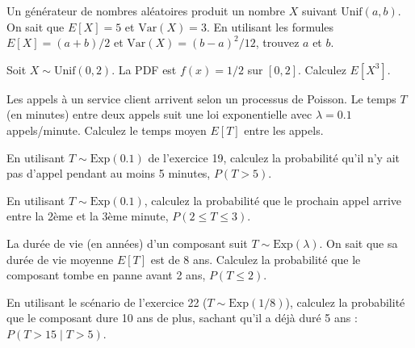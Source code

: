 \begin{exercicebox}
Un générateur de nombres aléatoires produit un nombre $X$ suivant $\text{Unif}(a, b)$. On sait que $E[X] = 5$ et $\text{Var}(X) = 3$.
En utilisant les formules $E[X] = (a+b)/2$ et $\text{Var}(X) = (b-a)^2/12$, trouvez $a$ et $b$.
\end{exercicebox}

\begin{exercicebox}
Soit $X \sim \text{Unif}(0, 2)$. La PDF est $f(x)=1/2$ sur $[0, 2]$.
Calculez $E[X^3]$.
\end{exercicebox}


\begin{exercicebox}
Les appels à un service client arrivent selon un processus de Poisson. Le temps $T$ (en minutes) entre deux appels suit une loi exponentielle avec $\lambda = 0.1$ appels/minute.
Calculez le temps moyen $E[T]$ entre les appels.
\end{exercicebox}

\begin{exercicebox}
En utilisant $T \sim \text{Exp}(0.1)$ de l'exercice 19, calculez la probabilité qu'il n'y ait pas d'appel pendant au moins 5 minutes, $P(T > 5)$.
\end{exercicebox}

\begin{exercicebox}
En utilisant $T \sim \text{Exp}(0.1)$, calculez la probabilité que le prochain appel arrive entre la 2ème et la 3ème minute, $P(2 \le T \le 3)$.
\end{exercicebox}

\begin{exercicebox}
La durée de vie (en années) d'un composant suit $T \sim \text{Exp}(\lambda)$. On sait que sa durée de vie moyenne $E[T]$ est de 8 ans.
Calculez la probabilité que le composant tombe en panne avant 2 ans, $P(T \le 2)$.
\end{exercicebox}

\begin{exercicebox}
En utilisant le scénario de l'exercice 22 ($T \sim \text{Exp}(1/8)$), calculez la probabilité que le composant dure 10 ans de plus, sachant qu'il a déjà duré 5 ans : $P(T > 15 \mid T > 5)$.
\end{exercicebox}

